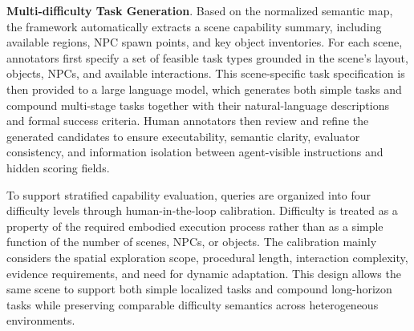 
\textbf{Multi-difficulty Task Generation}. Based on the normalized semantic map, the framework automatically extracts a scene capability summary, including available regions, NPC spawn points, and key object inventories. For each scene, annotators first specify a set of feasible task types grounded in the scene's layout, objects, NPCs, and available interactions. This scene-specific task specification is then provided to a large language model, which generates both simple tasks and compound multi-stage tasks together with their natural-language descriptions and formal success criteria. Human annotators then review and refine the generated candidates to ensure executability, semantic clarity, evaluator consistency, and information isolation between agent-visible instructions and hidden scoring fields.

To support stratified capability evaluation, queries are organized into four difficulty levels through human-in-the-loop calibration. Difficulty is treated as a property of the required embodied execution process rather than as a simple function of the number of scenes, NPCs, or objects. The calibration mainly considers the spatial exploration scope, procedural length, interaction complexity, evidence requirements, and need for dynamic adaptation. This design allows the same scene to support both simple localized tasks and compound long-horizon tasks while preserving comparable difficulty semantics across heterogeneous environments.


